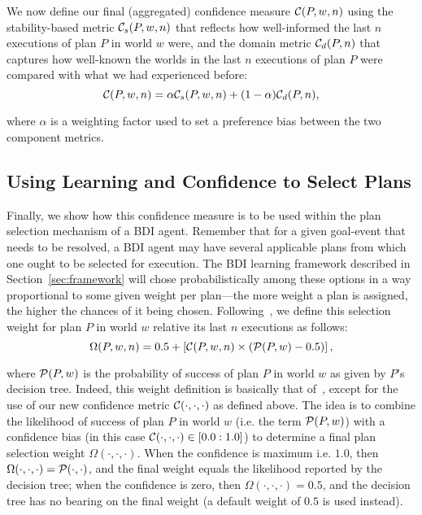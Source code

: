 We now define our final (aggregated) confidence measure $\C(P,w,n)$ using the stability-based metric $\C_s(P,w,n)$ that reflects how well-informed the last $n$ executions of plan $P$ in world $w$ were, and the domain metric $\C_d(P,n)$ that captures how well-known the worlds in the last $n$ executions of plan $P$ were compared with what we had experienced before:
\[
	\C(P,w,n) = \alpha\C_s(P,w,n) + (1-\alpha)\C_d(P,n),
\label{eqn:confidence}
\]

\noindent
where $\alpha$ is a weighting factor used to set a preference bias between the two component metrics.

\subsection{Using Learning and Confidence to Select Plans}\label{sec:selection}

\newcommand{\aSet}{\mathname{set}}
\newcommand{\aOperate}{\mathname{operate}}
\newcommand{\aEvaluate}{\mathname{evaluate}}

\newcommand{\pSet}{\mathname{Set*}}
\newcommand{\pSetCharge}{\mathname{SetCharge}}
\newcommand{\pSetDischarge}{\mathname{SetDischarge}}
\newcommand{\pSetNotUsed}{\mathname{SetNotUsed}}
\newcommand{\pExecute}{\mathname{Execute}}

\newcommand{\cSatisfies}{\psi}



Finally, we show how this confidence measure is to be used within the plan selection mechanism of a BDI agent. Remember that for a given goal-event that needs to be resolved, a BDI agent may have several applicable plans from which one ought to be selected for execution. The BDI learning framework described in Section~\ref{sec:framework} will chose probabilistically among these options in a way proportional to some given weight per plan---the more weight a plan is assigned, the higher the chances of it being chosen. 
Following~\cite{singh10:extending,singh10:learning}, we define this selection weight for plan $P$ in world $w$ relative its last $n$ executions as follows: 
\[
	\Omega(P,w,n) = 0.5 + \left[  \C(P,w,n) \times  \left( \P(P,w) - 0.5 \right)  \right],
\label{eqn:omega}   
\]

\noindent 
where $\P(P,w)$ is the probability of success of plan $P$ in world $w$ as given by $P$'s decision tree. 
%
Indeed, this weight definition is basically that of~\cite{singh10:extending,singh10:learning}, except for the use of our new confidence metric $\C(\cdot,\cdot,\cdot)$ as defined above. The idea is to combine the likelihood of success of plan $P$ in world $w$ (i.e. the term $\P(P,w)$) with a confidence bias (in this case $\C(\cdot,\cdot,\cdot) \in [0.0:1.0]$) to determine a final plan selection weight $\Omega(\cdot,\cdot,\cdot)$. 
When the confidence is maximum i.e. $1.0$, then $\Omega(\cdot,\cdot,\cdot) = \P(\cdot,\cdot)$, and the final weight equals the likelihood reported by the decision tree; when the confidence is zero, then $\Omega(\cdot,\cdot,\cdot)=0.5$, and the decision tree has no bearing on the final weight (a default weight of $0.5$ is used instead).

